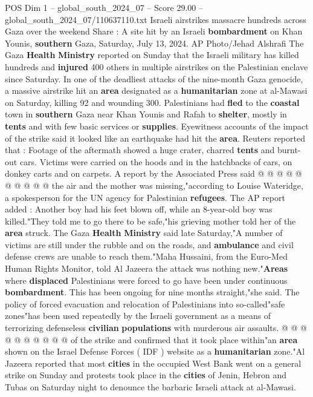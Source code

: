 \begin{textsample}{POS Dim 1 – global\_south\_2024\_07 – Score 29.00 – global\_south\_2024\_07/110637110.txt}  \label{ex:f1_pos_179}
Israeli airstrikes massacre hundreds across Gaza over the weekend Share : A site hit by an Israeli \textbf{bombardment} on Khan Younis, \textbf{southern} Gaza, Saturday, July 13, 2024.
AP Photo/Jehad Alshrafi The Gaza \textbf{Health} \textbf{Ministry} reported on Sunday that the Israeli military has killed hundreds and \textbf{injured} 400 others in multiple airstrikes on the Palestinian enclave since Saturday.
In one of the deadliest attacks of the nine-month Gaza genocide, a massive airstrike hit an \textbf{area} designated as a \textbf{humanitarian} zone at al-Mawasi on Saturday, killing 92 and wounding 300.
Palestinians had \textbf{fled} to the \textbf{coastal} town in \textbf{southern} Gaza near Khan Younis and Rafah to \textbf{shelter}, mostly in \textbf{tents} and with few basic services or \textbf{supplies}.
Eyewitness accounts of the impact of the strike said it looked like an earthquake had hit the \textbf{area}.
Reuters reported that : Footage of the aftermath showed a huge crater, charred \textbf{tents} and burnt-out cars.
Victims were carried on the hoods and in the hatchbacks of cars, on donkey carts and on carpets.
A report by the Associated Press said @ @ @ @ @ @ @ @ @ @ the air and the mother was missing,"according to Louise Wateridge, a spokesperson for the UN agency for Palestinian \textbf{refugees}.
The AP report added : Another boy had his feet blown off, while an 8-year-old boy was killed."They told me to go there to be safe,"his grieving mother told her of the \textbf{area} struck.
The Gaza \textbf{Health} \textbf{Ministry} said late Saturday,"A number of victims are still under the rubble and on the roads, and \textbf{ambulance} and civil defense crews are unable to reach them."Maha Hussaini, from the Euro-Med Human Rights Monitor, told Al Jazeera the attack was nothing new."\textbf{Areas} where \textbf{displaced} Palestinians were forced to go have been under continuous \textbf{bombardment}.
This has been ongoing for nine months straight,"she said.
The policy of forced evacuation and relocation of Palestinians into so-called"safe zones"has been used repeatedly by the Israeli government as a means of terrorizing defenseless \textbf{civilian} \textbf{populations} with murderous air assaults. @ @ @ @ @ @ @ @ @ @ of the strike and confirmed that it took place within"an \textbf{area} shown on the Israel Defense Forces ( IDF ) website as a \textbf{humanitarian} zone."Al Jazeera reported that most \textbf{cities} in the occupied West Bank went on a general strike on Sunday and protests took place in the \textbf{cities} of Jenin, Hebron and Tubas on Saturday night to denounce the barbaric Israeli attack at al-Mawasi.

\end{textsample}

